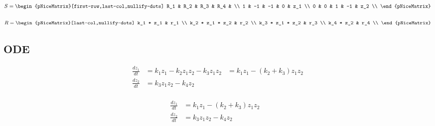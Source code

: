 \documentclass[]{scrartcl}
\begin{document}
\begin{center}
\noindent \begin{minipage}{.4\linewidth}
$
S =
\begin{pNiceMatrix}[first-row,last-col,nullify-dots]
	R_1	&	R_2 &	R_3 &	R_4 &		\\
	  1 &	 -1 &	 -1 &	  0 &	z_1 \\
	  0 &	  0 &	  1 &	 -1 &	z_2 \\
\end{pNiceMatrix}
$
\end{minipage}
\noindent \begin{minipage}{.4\linewidth}
$
R =
\begin{pNiceMatrix}[last-col,nullify-dots]
	k_1 * z_1		& r_1 \\
	k_2 * z_1 * z_2 & r_2 \\
	k_3 * z_1 * z_2 & r_3 \\
	k_4 * z_2		& r_4 \\
\end{pNiceMatrix}
$
\end{minipage}
\end{center}



\subsection*{ODE}

\begin{center}
\noindent \begin{minipage}{.5\linewidth}
\begin{align*}
	\frac{dz_1}{dt} & = k_1 z_1 - k_2 z_1 z_2 - k_3 z_1 z_2 & =  k_1 z_1 - (k_2 + k_3) z_1 z_2 \\
	\frac{dz_2}{dt} & = k_3 z_1 z_2 - k_4 z_2 & \\
\end{align*}
\end{minipage}
\end{center}


\begin{center}
\noindent \begin{minipage}{.5\linewidth}
\begin{align*}
	\frac{dz_1}{dt} & = k_1 z_1 - (k_2 + k_3) z_1 z_2 \\
	\frac{dz_2}{dt} & = k_3 z_1 z_2 - k_4 z_2 & \\
\end{align*}
\end{minipage}
\end{center}
\end{document}
